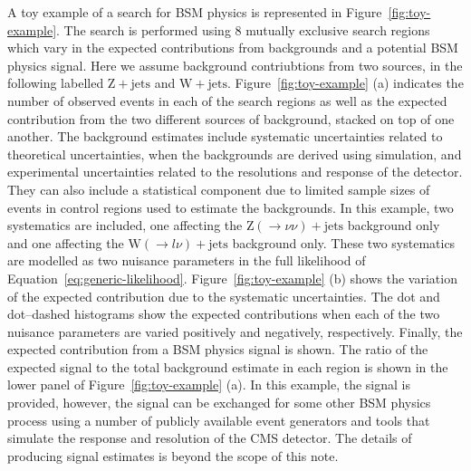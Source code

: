 A toy example of a search for BSM physics is represented in Figure~\ref{fig:toy-example}. The search is performed using 8 mutually exclusive search regions 
which vary in the expected contributions from backgrounds and a potential BSM physics signal. Here we assume background contriubtions from two sources,
in the following labelled $\mathrm{Z+jets}$ and $\mathrm{W+jets}$. Figure~\ref{fig:toy-example} (a) indicates the 
number of observed events in each of the search regions as well as the expected contribution from the two different sources of background, stacked on top of one another. 
The background estimates include systematic uncertainties related to theoretical uncertainties, when the backgrounds are derived using 
simulation, and experimental uncertainties related to the resolutions and response of the detector. They can also include a statistical component 
due to limited sample sizes of events in control regions used to estimate the backgrounds. In this example, two systematics are included, one affecting the $\mathrm{Z}(\rightarrow \nu\nu)+\mathrm{jets}$ background only
and one affecting the $\mathrm{W}(\rightarrow l\nu)+\mathrm{jets}$ background only. These two systematics are modelled as two nuisance parameters in the full likelihood of Equation~\ref{eq:generic-likelihood}. 
Figure~\ref{fig:toy-example} (b) shows the variation of the expected contribution due to the systematic uncertainties. 
The dot and dot--dashed histograms show the expected 
contributions when each of the two nuisance parameters are varied positively and negatively, respectively.
Finally, the expected contribution from a BSM physics signal is shown. 
The ratio of the expected signal to the total background estimate in each region is shown in the lower panel of Figure~\ref{fig:toy-example} (a). 
In this example, the signal is provided, however, the 
signal can be exchanged for some other BSM physics process using a number of publicly available event generators and tools that simulate the response 
and resolution of the CMS detector. The details of producing signal estimates is beyond the scope of this note. 

